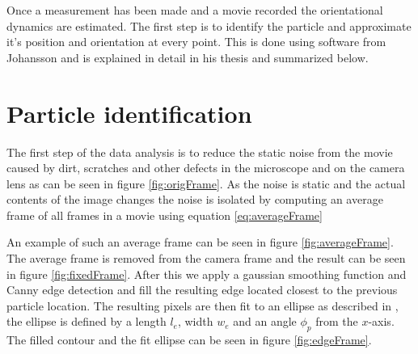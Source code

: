 Once a measurement has been made and a movie recorded the orientational dynamics are estimated. The first step is to identify the particle and approximate it's position and orientation at every point. This is done using software from Johansson \cite{AntonThesis} and is explained in detail in his thesis and summarized below.

\section{Particle identification}\label{sec:particleidentification}

The first step of the data analysis is to reduce the static noise from the movie caused by dirt, scratches and other defects in the microscope and on the camera lens as can be seen in figure \ref{fig:origFrame}. As the noise is static and the actual contents of the image changes the noise is isolated by computing an average frame of all frames in a movie using equation \ref{eq:averageFrame}

An example of such an average frame can be seen in figure \ref{fig:averageFrame}. The average frame is removed from the camera frame and the result can be seen in figure \ref{fig:fixedFrame}. After this we apply a gaussian smoothing function and Canny edge detection \cite{Canny} and fill the resulting edge located closest to the previous particle location. The resulting pixels are then fit to an ellipse as described in \cite{AntonThesis, EllipseFit}, the ellipse is defined by a length $l_e$, width $w_e$ and an angle $\phi_p$ from the $x$-axis. The filled contour and the fit ellipse can be seen in figure 
\ref{fig:edgeFrame}.

